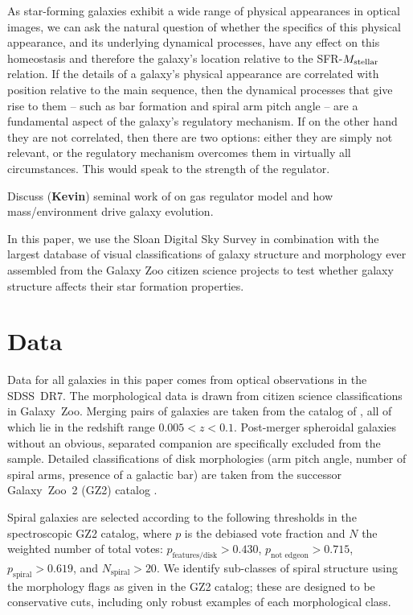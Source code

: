 \documentclass{emulateapj}
\newcommand{\kevin}{{\color{red}\textbf{Kevin}}}
\begin{document}
As star-forming galaxies exhibit a wide range of physical appearances in optical images, we can ask the natural question of whether the specifics of this physical appearance, and its underlying dynamical processes, have any effect on this homeostasis and therefore the galaxy's location relative to the SFR-$M_{\rm stellar}$ relation. If the details of a galaxy's physical appearance are correlated with position relative to the main sequence, then the dynamical processes that give rise to them -- such as bar formation and spiral arm pitch angle -- are a fundamental aspect of the galaxy's regulatory mechanism. If on the other hand they are not correlated, then there are two options: either they are simply not relevant, or the regulatory mechanism overcomes them in virtually all circumstances. This would speak to the strength of the regulator.

Discuss (\kevin) seminal work of \citet{pen10a,pen12,pen14a,pen14} on gas regulator model and how mass/environment drive galaxy evolution. 

In this paper, we use the Sloan Digital Sky Survey \citep{yor00,str02,aba09} in combination with the largest database of visual classifications of galaxy structure and morphology ever assembled from the Galaxy Zoo citizen science projects \citep{lin08,lin11,wil13} to test whether galaxy structure affects their star formation properties.



\section{Data} \label{sec-data}

Data for all galaxies in this paper comes from optical observations in the SDSS~DR7. The morphological data is drawn from citizen science classifications in Galaxy~Zoo. Merging pairs of galaxies are taken from the catalog of \citet{dar10a}, all of which lie in the redshift range $0.005<z<0.1$. Post-merger spheroidal galaxies without an obvious, separated companion \citep{car12} are specifically excluded from the sample. Detailed classifications of disk morphologies (arm pitch angle, number of spiral arms, presence of a galactic bar) are taken from the successor Galaxy~Zoo~2 (GZ2) catalog \citep{wil13}. 

Spiral galaxies are selected according to the following thresholds in the spectroscopic GZ2 catalog, where $p$ is the debiased vote fraction and $N$ the weighted number of total votes: $p_\textrm{features/disk} > 0.430$, $p_\textrm{not~edgeon} > 0.715$, $p_\textrm{spiral}>0.619$, and $N_\textrm{spiral}>20$. We identify sub-classes of spiral structure using the morphology flags as given in the GZ2 catalog; these are designed to be conservative cuts, including only robust examples of each morphological class. 
\end{document}
